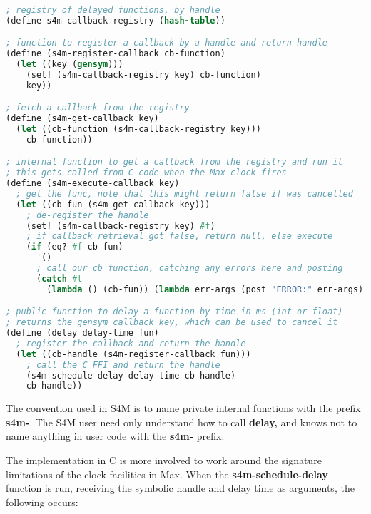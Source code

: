 \documentclass[acmsmall]{acmart}
\begin{document}
\begin{lstlisting}[language=lisp]

; registry of delayed functions, by handle 
(define s4m-callback-registry (hash-table))

; function to register a callback by a handle and return handle
(define (s4m-register-callback cb-function)
  (let ((key (gensym)))
    (set! (s4m-callback-registry key) cb-function)
    key))

; fetch a callback from the registry 
(define (s4m-get-callback key)
  (let ((cb-function (s4m-callback-registry key)))
    cb-function))

; internal function to get a callback from the registry and run it
; this gets called from C code when the Max clock fires
(define (s4m-execute-callback key)
  ; get the func, note that this might return false if was cancelled
  (let ((cb-fun (s4m-get-callback key)))
    ; de-register the handle
    (set! (s4m-callback-registry key) #f)
    ; if callback retrieval got false, return null, else execute 
    (if (eq? #f cb-fun) 
      '()
      ; call our cb function, catching any errors here and posting
      (catch #t 
        (lambda () (cb-fun)) (lambda err-args (post "ERROR:" err-args))))))

; public function to delay a function by time in ms (int or float)
; returns the gensym callback key, which can be used to cancel it
(define (delay delay-time fun)
  ; register the callback and return the handle
  (let ((cb-handle (s4m-register-callback fun)))
    ; call the C FFI and return the handle
    (s4m-schedule-delay delay-time cb-handle)
    cb-handle))

\end{lstlisting}

The convention used in S4M is to name private internal functions with the
prefix \textbf{s4m-}. The S4M user need only understand how to call
\textbf{delay,} and knows not to name anything in user code with the \textbf{s4m-} prefix.

The implementation in C is more involved to work around the signature 
limitations of the clock facilities in Max.
When the \textbf{s4m-schedule-delay} function is run, receiving the symbolic handle
and delay time as arguments, the following occurs:
\end{document}
